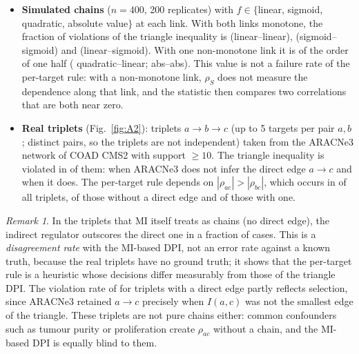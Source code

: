 \documentclass[11pt,a4paper]{article}
\theoremstyle{plain}
\theoremstyle{remark}
\newtheorem{remark}{Remark}
\newcommand{\MI}{I}
\newcommand{\rhoS}{\rho_{S}}
\begin{document}
\begin{itemize}
  \item \textbf{Simulated chains} ($n=400$, 200 replicates) with $f\in\{$linear, sigmoid,
  quadratic, absolute value$\}$ at each link. With both links monotone, the fraction of
  violations of the triangle inequality is \ATwosimlinearlinearviol{} (linear--linear),
  \ATwosimsigmoidsigmoidviol{} (sigmoid--sigmoid) and \ATwosimlinearsigmoidviol{}
  (linear--sigmoid). With one non-monotone link it is of the order of one half
  (\ATwosimsquarelinearviol{} quadratic--linear; \ATwosimabsabsviol{} abs--abs). This value is not a
  failure rate of the per-target rule: with a non-monotone link, $\rhoS$ does not measure the dependence
  along that link, and the statistic then compares two correlations that are both near zero.
  \item \textbf{Real triplets} (Fig.~\ref{fig:A2}): \ATworealntriplets{} triplets $a\to b\to c$
  (up to 5 targets per pair $a,b$; \ATworealntfpairs{} distinct pairs, so the triplets are not
  independent) taken from the ARACNe3 network of COAD CMS2 with support $\ge10$. The triangle
  inequality is violated in \ATworealfracviolationsall{} of them:
  \ATworealfracviolationsnodirect{} when ARACNe3 does not infer the direct edge $a\to c$ and
  \ATworealfracviolationsdirect{} when it does. The per-target rule depends on
  $|\rho_{ac}|>|\rho_{bc}|$, which occurs in \ATworealfracabeatsball{} of all triplets,
  \ATworealfracabeatsbnodirect{} of those without a direct edge and \ATworealfracabeatsbdirect{}
  of those with one.
\end{itemize}
\begin{remark}
In the triplets that MI itself treats as chains (no direct edge), the indirect regulator
outscores the direct one in a fraction \ATworealfracabeatsbnodirect{} of cases. This is a \emph{disagreement rate} with the MI-based DPI, not an
error rate against a known truth, because the real triplets have no ground truth; it shows that the per-target rule is a heuristic
whose decisions differ measurably from those of the triangle DPI. The violation rate of \ATworealfracviolationsdirect{} for triplets with a direct
edge partly reflects selection, since ARACNe3 retained $a\to c$ precisely when $\MI(a,c)$ was not the smallest edge of the triangle. These
triplets are not pure chains either: common confounders such as tumour purity or proliferation
create $\rho_{ac}$ without a chain, and the MI-based DPI is equally blind to them.
\end{remark}
\end{document}
